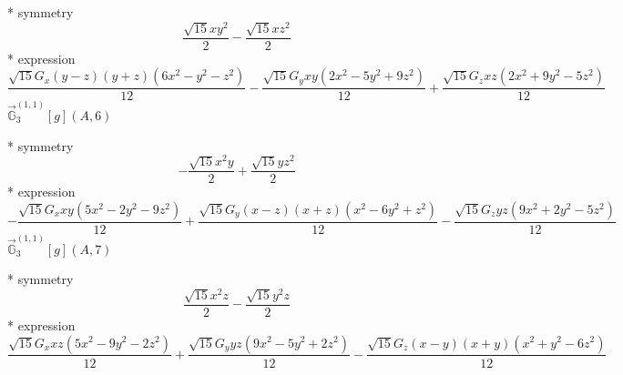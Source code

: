 \documentclass[fleqn,8pt]{jsarticle}
\begin{document}
\noindent\quad ** symmetry
\begin{dmath*}
\frac{\sqrt{15} x y^{2}}{2} - \frac{\sqrt{15} x z^{2}}{2}
\end{dmath*}
\noindent\quad ** expression
\begin{dmath*}
\frac{\sqrt{15} G_{x} \left(y - z\right) \left(y + z\right) \left(6 x^{2} - y^{2} - z^{2}\right)}{12} - \frac{\sqrt{15} G_{y} x y \left(2 x^{2} - 5 y^{2} + 9 z^{2}\right)}{12} + \frac{\sqrt{15} G_{z} x z \left(2 x^{2} + 9 y^{2} - 5 z^{2}\right)}{12}
\end{dmath*}
\noindent\quad $\vec{\mathbb{G}}_{3}^{(1,1)}[g](A,6)$

\noindent\quad ** symmetry
\begin{dmath*}
- \frac{\sqrt{15} x^{2} y}{2} + \frac{\sqrt{15} y z^{2}}{2}
\end{dmath*}
\noindent\quad ** expression
\begin{dmath*}
- \frac{\sqrt{15} G_{x} x y \left(5 x^{2} - 2 y^{2} - 9 z^{2}\right)}{12} + \frac{\sqrt{15} G_{y} \left(x - z\right) \left(x + z\right) \left(x^{2} - 6 y^{2} + z^{2}\right)}{12} - \frac{\sqrt{15} G_{z} y z \left(9 x^{2} + 2 y^{2} - 5 z^{2}\right)}{12}
\end{dmath*}
\noindent\quad $\vec{\mathbb{G}}_{3}^{(1,1)}[g](A,7)$

\noindent\quad ** symmetry
\begin{dmath*}
\frac{\sqrt{15} x^{2} z}{2} - \frac{\sqrt{15} y^{2} z}{2}
\end{dmath*}
\noindent\quad ** expression
\begin{dmath*}
\frac{\sqrt{15} G_{x} x z \left(5 x^{2} - 9 y^{2} - 2 z^{2}\right)}{12} + \frac{\sqrt{15} G_{y} y z \left(9 x^{2} - 5 y^{2} + 2 z^{2}\right)}{12} - \frac{\sqrt{15} G_{z} \left(x - y\right) \left(x + y\right) \left(x^{2} + y^{2} - 6 z^{2}\right)}{12}
\end{dmath*}
\end{document}
